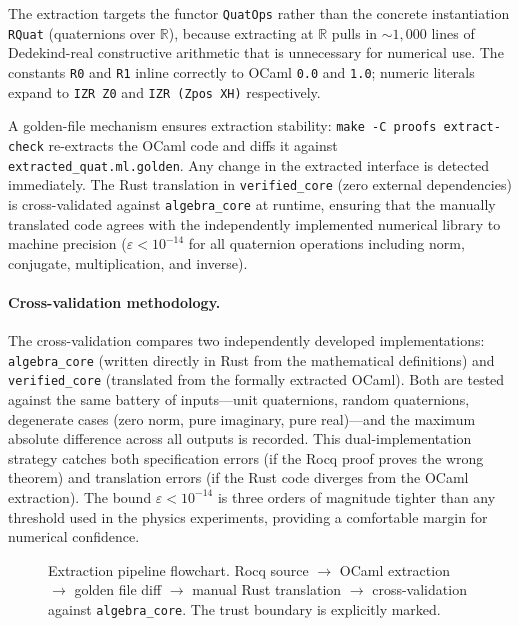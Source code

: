 \documentclass[12pt,openany]{report}
\theoremstyle{definition}
\theoremstyle{plain}
\theoremstyle{remark}
\begin{document}
The extraction targets the functor \texttt{QuatOps} rather than the
concrete instantiation \texttt{RQuat} (quaternions over $\mathbb{R}$),
because extracting at $\mathbb{R}$ pulls in ${\sim}1{,}000$ lines of
Dedekind-real constructive arithmetic that is unnecessary for numerical
use.  The constants \texttt{R0} and \texttt{R1} inline correctly to
OCaml \texttt{0.0} and \texttt{1.0}; numeric literals expand to
\texttt{IZR Z0} and \texttt{IZR (Zpos XH)} respectively.

A golden-file mechanism ensures extraction stability: \texttt{make -C
proofs extract-check} re-extracts the OCaml code and diffs it against
\texttt{extracted\_quat.ml.golden}.  Any change in the extracted
interface is detected immediately.  The Rust translation in
\texttt{verified\_core} (zero external dependencies) is cross-validated
against \texttt{algebra\_core} at runtime, ensuring that the manually
translated code agrees with the independently implemented numerical
library to machine precision ($\varepsilon < 10^{-14}$ for all
quaternion operations including norm, conjugate, multiplication,
and inverse).

\paragraph{Cross-validation methodology.}
The cross-validation compares two independently developed
implementations: \texttt{algebra\_core} (written directly in Rust from
the mathematical definitions) and \texttt{verified\_core} (translated
from the formally extracted OCaml).  Both are tested against the same
battery of inputs---unit quaternions, random quaternions, degenerate
cases (zero norm, pure imaginary, pure real)---and the maximum absolute
difference across all outputs is recorded.  This dual-implementation
strategy catches both specification errors (if the Rocq proof proves the
wrong theorem) and translation errors (if the Rust code diverges from
the OCaml extraction).  The bound $\varepsilon < 10^{-14}$ is three
orders of magnitude tighter than any threshold used in the physics
experiments, providing a comfortable margin for numerical confidence.

\begin{figure}[htbp]
\centering

\caption{Extraction pipeline flowchart.  Rocq source $\to$ OCaml
extraction $\to$ golden file diff $\to$ manual Rust translation
$\to$ cross-validation against \texttt{algebra\_core}.  The trust
boundary is explicitly marked.}
\label{fig:extraction}
\end{figure}
\end{document}
